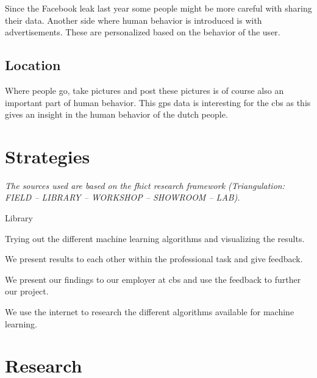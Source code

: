 \documentclass{article}
\begin{document}
Since the Facebook leak last year some people might be more careful with sharing their data. Another side where human behavior is introduced is with advertisements. These are personalized based on the behavior of the user.
\subsection{Location}
Where people go, take pictures and post these pictures is of course also an important part of human behavior. This \gls{gps} data is interesting for the \gls{cbs} as this gives an insight in the human behavior of the dutch people. 

\section{Strategies}
\textit{The sources used are based on the \gls{fhict} research framework (Triangulation: FIELD – LIBRARY – WORKSHOP – SHOWROOM – LAB).}
\begin{labeling}{Library}
    \item[\textbf{Lab}] Trying out the different machine learning algorithms and visualizing the results.
    \item[\textbf{Showroom}] We present results to each other within the professional task and give feedback.
    \item[\textbf{Showroom}] We present our findings to our employer at \gls{cbs} and use the feedback to further our project.
    \item[\textbf{Library}] We use the internet to research the different algorithms available for machine learning.
\end{labeling}

\section{Research}
\end{document}
